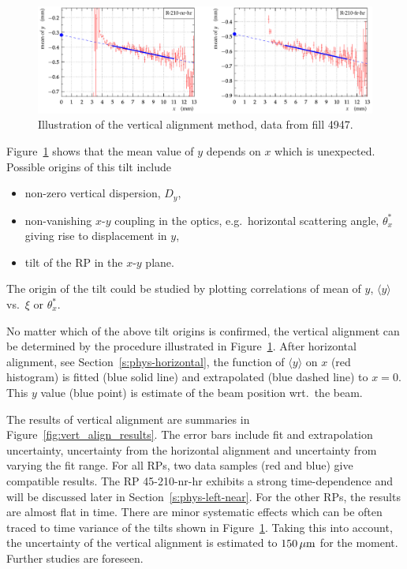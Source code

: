\documentclass[TOTEM]{cern/cernphprep}
\def\un#1{\,{\rm #1}}
\begin{document}
\begin{figure}[h!]
\begin{center}
\includegraphics[width=0.8\hsize]{fig/physics_fills/y_alignment_method_example.pdf}
\caption{%
Illustration of the vertical alignment method, data from fill 4947.
}
\label{fig:vert_align_method}
\end{center}
\end{figure}



Figure~\ref{fig:vert_align_method} shows that the mean value of $y$ depends on $x$ which is unexpected. Possible origins of this tilt include
\begin{itemize}[nosep]
\item non-zero vertical dispersion, $D_y$,
\item non-vanishing $x$-$y$ coupling in the optics, e.g.~horizontal scattering angle, $\theta_x^*$ giving rise to displacement in $y$,
\item tilt of the RP in the $x$-$y$ plane.
\end{itemize}
The origin of the tilt could be studied by plotting correlations of mean of $y$, $\langle y\rangle$ vs.~$\xi$ or $\theta_x^*$.

No matter which of the above tilt origins is confirmed, the vertical alignment can be determined by the procedure illustrated in Figure~\ref{fig:vert_align_method}. After horizontal alignment, see Section~\ref{s:phys-horizontal}, the function of $\langle y\rangle$ on $x$ (red histogram) is fitted (blue solid line) and extrapolated (blue dashed line) to $x = 0$. This $y$ value (blue point) is estimate of the beam position wrt.~the beam.

The results of vertical alignment are summaries in Figure~\ref{fig:vert_align_results}. The error bars include fit and extrapolation uncertainty, uncertainty from the horizontal alignment and uncertainty from varying the fit range. For all RPs, two data samples (red and blue) give compatible results. The RP 45-210-nr-hr exhibits a strong time-dependence and will be discussed later in Section~\ref{s:phys-left-near}. For the other RPs, the results are almost flat in time. There are minor systematic effects which can be often traced to time variance of the tilts shown in Figure~\ref{fig:vert_align_method}. Taking this into account, the uncertainty of the vertical alignment is estimated to $150\un{\mu m}$ for the moment. Further studies are foreseen.
\end{document}
